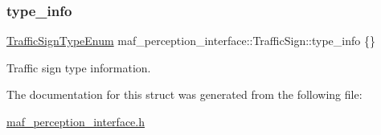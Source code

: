 \subsubsection{\texorpdfstring{type\+\_\+info}{type\_info}}
{\footnotesize\ttfamily \hyperlink{structmaf__perception__interface_1_1TrafficSignTypeEnum}{Traffic\+Sign\+Type\+Enum} maf\+\_\+perception\+\_\+interface\+::\+Traffic\+Sign\+::type\+\_\+info \{\}}



Traffic sign type information. 



The documentation for this struct was generated from the following file\+:\begin{DoxyCompactItemize}
\item 
\hyperlink{maf__perception__interface_8h}{maf\+\_\+perception\+\_\+interface.\+h}\end{DoxyCompactItemize}
